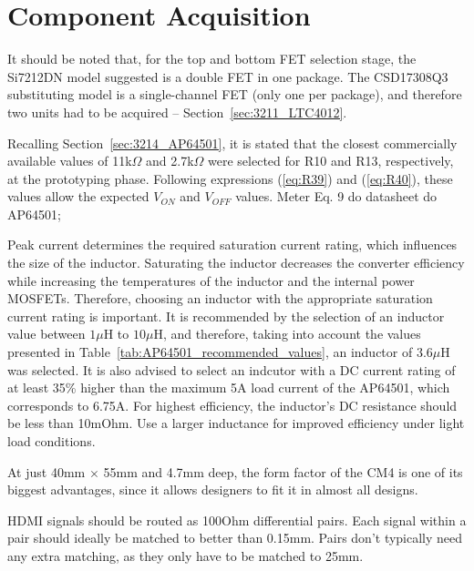\section{Component Acquisition}\label{sec:52_ComponentAcquisition}



It should be noted that, for the top and bottom FET selection stage, the Si7212DN model suggested is a double FET in one package. The CSD17308Q3 substituting model is a single-channel FET (only one per package), and therefore two units had to be acquired -- Section~\ref{sec:3211_LTC4012}.

Recalling Section~\ref{sec:3214_AP64501}, it is stated that the closest commercially available values of 11k$\Omega$ and 2.7k$\Omega$ were selected for R10 and R13, respectively, at the prototyping phase. Following expressions (\ref{eq:R39}) and (\ref{eq:R40}), these values allow the expected $V_{ON}$ and $V_{OFF}$ values.
    Meter Eq. 9 do datasheet do AP64501;
    
    Peak current determines the required saturation current rating, which influences the size of the inductor. Saturating the inductor decreases the converter efficiency while increasing the temperatures of the inductor and the internal power MOSFETs. Therefore, choosing an inductor with the appropriate saturation current rating is important. 
    It is recommended by \cite{AP64501} the selection of an inductor value between $1 \mu$H to $10 \mu$H, and therefore, taking into account the values presented in Table~\ref{tab:AP64501_recommended_values}, an inductor of $3.6 \mu$H was selected. It is also advised to select an indcutor with a DC current rating of at least 35\% higher than the maximum 5A load current of the AP64501, which corresponds to 6.75A.
    For highest efficiency, the inductor's DC resistance should be less than 10mOhm. Use a larger inductance for improved efficiency under light load conditions.


    At just 40mm $\times$ 55mm and 4.7mm deep, the form factor of the CM4 is one of its biggest advantages, since it allows designers to fit it in almost all designs.

    HDMI signals should be routed as 100Ohm differential pairs. Each signal within a pair should ideally be matched to better than 0.15mm. Pairs don't typically need any extra matching, as they only have to be matched to 25mm.


